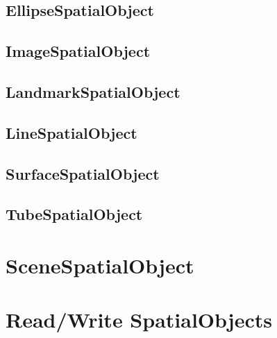 \subsection{EllipseSpatialObject}
\label{sec:EllipseSpatialObject}
\ifitkFullVersion 

\fi

\subsection{ImageSpatialObject}
\label{sec:ImageSpatialObject}
\ifitkFullVersion 

\fi

\subsection{LandmarkSpatialObject}
\label{sec:LandmarkSpatialObject}
\ifitkFullVersion 

\fi

\subsection{LineSpatialObject}
\label{sec:LineSpatialObject}
\ifitkFullVersion 

\fi

\subsection{SurfaceSpatialObject}
\label{sec:SurfaceSpatialObject}
\ifitkFullVersion 

\fi

\subsection{TubeSpatialObject}
\label{sec:TubeSpatialObject}
\ifitkFullVersion 

\fi

\section{SceneSpatialObject}
\label{sec:Scene}
\ifitkFullVersion 

\fi

\section{Read/Write SpatialObjects}
\label{sec:ReadWriteSpatialObjects}
\ifitkFullVersion 

\fi
